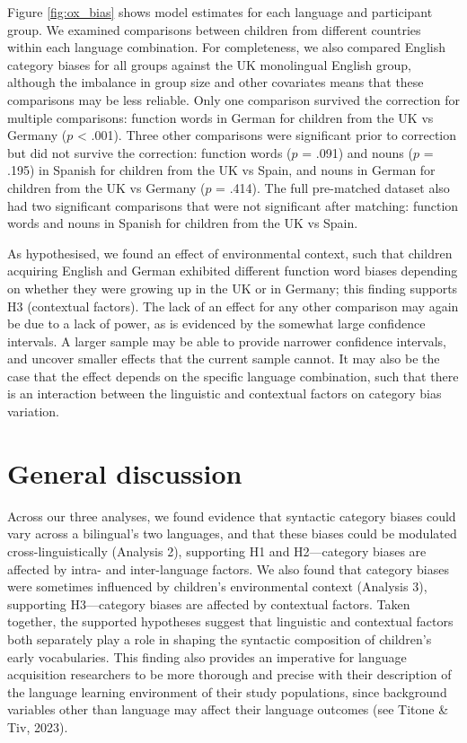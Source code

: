 \documentclass[10pt, letterpaper]{article}
\begin{document}
Figure \ref{fig:ox_bias} shows model estimates for each language and
participant group. We examined comparisons between children from
different countries within each language combination. For completeness,
we also compared English category biases for all groups against the UK
monolingual English group, although the imbalance in group size and
other covariates means that these comparisons may be less reliable. Only
one comparison survived the correction for multiple comparisons:
function words in German for children from the UK vs Germany (\(p\)
\textless{} .001). Three other comparisons were significant prior to
correction but did not survive the correction: function words (\(p\) =
.091) and nouns (\(p\) = .195) in Spanish for children from the UK vs
Spain, and nouns in German for children from the UK vs Germany (\(p\) =
.414). The full pre-matched dataset also had two significant comparisons
that were not significant after matching: function words and nouns in
Spanish for children from the UK vs Spain.

As hypothesised, we found an effect of environmental context, such that
children acquiring English and German exhibited different function word
biases depending on whether they were growing up in the UK or in
Germany; this finding supports H3 (contextual factors). The lack of an
effect for any other comparison may again be due to a lack of power, as
is evidenced by the somewhat large confidence intervals. A larger sample
may be able to provide narrower confidence intervals, and uncover
smaller effects that the current sample cannot. It may also be the case
that the effect depends on the specific language combination, such that
there is an interaction between the linguistic and contextual factors on
category bias variation.

\section{General discussion}\label{general-discussion}

Across our three analyses, we found evidence that syntactic category
biases could vary across a bilingual's two languages, and that these
biases could be modulated cross-linguistically (Analysis 2), supporting
H1 and H2---category biases are affected by intra- and inter-language
factors. We also found that category biases were sometimes influenced by
children's environmental context (Analysis 3), supporting H3---category
biases are affected by contextual factors. Taken together, the supported
hypotheses suggest that linguistic and contextual factors both
separately play a role in shaping the syntactic composition of
children's early vocabularies. This finding also provides an imperative
for language acquisition researchers to be more thorough and precise
with their description of the language learning environment of their
study populations, since background variables other than language may
affect their language outcomes (see Titone \& Tiv, 2023).
\end{document}
